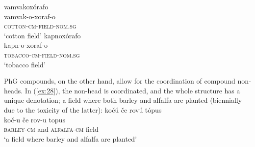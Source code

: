 \documentclass[output=paper]{LSP/langsci}
\begin{document}
\z
\begin{multicols}{2}
\ea\label{ex:27}
	\ea\label{ex:27a}
		\glll vamvakoxórafo\\
				vamvak-o-xoraf-o\\
				\textsc{cotton-cm-field-nom.sg}\\
		\glt	`cotton field'
	\ex\label{ex:27b}
		\glll	kapnoxórafo\\
				kapn-o-xoraf-o\\
				\textsc{tobacco-cm-field-nom.sg}\\
		\glt	`tobacco field'
	\z
\z
\end{multicols}

PhG compounds, on the other hand, allow for the coordination of compound non-heads. In (\ref{ex:28}), the non-head is coordinated, and the whole structure has a unique denotation; a field where both barley and alfalfa are planted (biennially due to the toxicity of the latter):
\ea\label{ex:28}
	\glll kočú če rovú tópus\\
			koč-u če rov-u topus\\
			\textsc{barley-cm} and \textsc{alfalfa-cm} field\\
	\glt `a field where barley and alfalfa are planted'
\z
\end{document}
